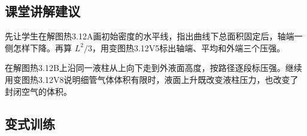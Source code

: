 \documentclass[UTF8,fontset=fandol,a4paper,11pt]{ctexart}
\begin{document}

\subsection*{课堂讲解建议}

先让学生在解图热3.12A画初始密度的水平线，指出曲线下总面积固定后，轴端一侧怎样下降。再算 $L^2/3$，用变图热3.12V5标出轴端、平均和外端三个压强。

在解图热3.12B上沿同一液柱从上向下走到外液面高度，按路径逐段标压强。继续用变图热3.12V8说明细管气体体积有限时，液面上升既改变液柱压力，也改变了封闭空气的体积。



\subsection*{变式训练}
\end{document}
